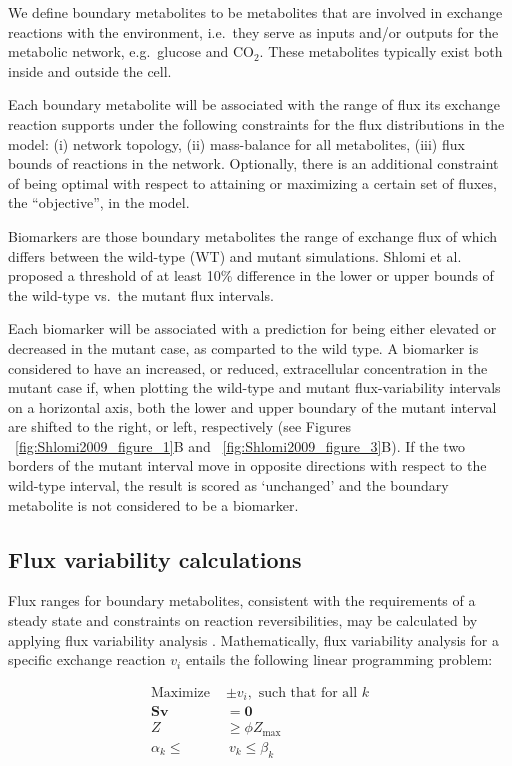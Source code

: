 \documentclass[10pt,a4paper,onecolumn]{article}
\begin{document}
We define boundary metabolites to be metabolites that are involved in
exchange reactions with the environment, i.e.~they serve as inputs
and/or outputs for the metabolic network, e.g.~glucose and CO\(_2\).
These metabolites typically exist both inside and outside the cell.

Each boundary metabolite will be associated with the range of flux its
exchange reaction supports under the following constraints for the flux
distributions in the model: (i) network topology, (ii) mass-balance for
all metabolites, (iii) flux bounds of reactions in the network.
Optionally, there is an additional constraint of being optimal with
respect to attaining or maximizing a certain set of fluxes, the
``objective'', in the model.

Biomarkers are those boundary metabolites the range of exchange flux of
which differs between the wild-type (WT) and mutant simulations. Shlomi
et al. proposed a threshold of at least 10\% difference in the lower or
upper bounds of the wild-type vs.~the mutant flux intervals.

Each biomarker will be associated with a prediction for being either
elevated or decreased in the mutant case, as comparted to the wild type.
A biomarker is considered to have an increased, or reduced,
extracellular concentration in the mutant case if, when plotting the
wild-type and mutant flux-variability intervals on a horizontal axis,
both the lower and upper boundary of the mutant interval are shifted to
the right, or left, respectively (see Figures
~\ref{fig:Shlomi2009_figure_1}B and ~\ref{fig:Shlomi2009_figure_3}B). If
the two borders of the mutant interval move in opposite directions with
respect to the wild-type interval, the result is scored as `unchanged'
and the boundary metabolite is not considered to be a biomarker.

\subsection{Flux variability
calculations}\label{flux-variability-calculations}

Flux ranges for boundary metabolites, consistent with the requirements
of a steady state and constraints on reaction reversibilities, may be
calculated by applying flux variability analysis
\autocite{Mahadevan2003}. Mathematically, flux variability analysis for
a specific exchange reaction \(v_i\) entails the following linear
programming problem:

\begin{align}
\text{Maximize } &\pm v_i, \text{ such that for all } k \nonumber \\
\bm{S} \bm{v} &= \bm{0} \nonumber \\
Z  &\geq \phi Z_{\text{max}} \nonumber \\
\alpha_k \leq & ~ v_k \leq \beta_k 
\end{align}
\end{document}
